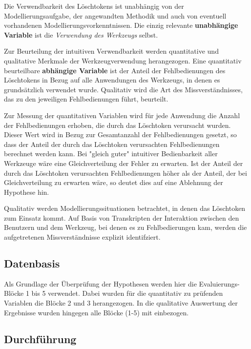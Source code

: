 Die Verwendbarkeit des Löschtokens ist unabhängig von der Modellierungsaufgabe, der angewandten Methodik und auch von eventuell vorhandenen Modellierungsvorkenntnissen. Die einzig relevante \textbf{unabhängige Variable} ist die \emph{Verwendung des Werkzeugs} selbst. 

Zur Beurteilung der intuitiven Verwendbarkeit werden quantitative und qualitative Merkmale der Werkzeugverwendung herangezogen. Eine quantitativ beurteilbare \textbf{abhängige Variable} ist der Anteil der Fehlbedienungen des Löschtokens in Bezug auf alle Anwendungen des Werkzeugs, in denen es grundsätzlich verwendet wurde. Qualitativ wird die Art des Missverständnisses, das zu den jeweiligen Fehlbedienungen führt, beurteilt.

Zur Messung der quantitativen Variablen wird für jede Anwendung die Anzahl der Fehlbedienungen erhoben, die durch das Löschtoken verursacht wurden. Dieser Wert wird in Bezug zur Gesamtanzahl der Fehlbedienungen gesetzt, so dass der Anteil der durch das Löschtoken verursachten Fehlbedienungen berechnet werden kann. Bei "gleich guter" intuitiver Bedienbarkeit aller Werkzeuge wäre eine Gleichverteilung der Fehler zu erwarten. Ist der Anteil der durch das Löschtoken verursachten Fehlbedienungen höher als der Anteil, der bei Gleichverteilung zu erwarten wäre, so deutet dies auf eine Ablehnung der Hypothese hin.

Qualitativ werden Modellierungssituationen betrachtet, in denen das Löschtoken zum Einsatz kommt. Auf Basis von Transkripten der Interaktion zwischen den Benutzern und dem Werkzeug, bei denen es zu Fehlbedierungen kam, werden die aufgetretenen Missverständnisse explizit identifziert.



\subsection{Datenbasis} %
\label{sub:datenbasis}

Als Grundlage der Überprüfung der Hypothesen werden hier die Evaluierungs-Blöcke 1 bis 5 verwendet. Dabei wurden für die quantitativ zu prüfenden Variablen die Blöcke 2 und 3 herangezogen. In die qualitative Auswertung der Ergebnisse wurden hingegen alle Blöcke (1-5) mit einbezogen.


\subsection{Durchführung} %
\label{sub:durchführung}

